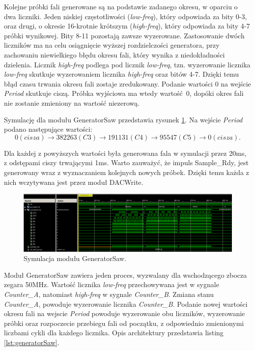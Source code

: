 \documentclass[a4paper,12pt]{article}
\begin{document}
Kolejne próbki fali generowane są na podstawie zadanego okresu, w oparciu o dwa liczniki. Jeden niskiej częstotliwości (\textit{low-freq}), który odpowiada za bity 0-3, oraz drugi, o okresie 16-krotnie krótszym (\textit{high-freq}), który odpowiada za bity 4-7 próbki wynikowej. Bity 8-11 pozostają zawsze wyzerowane. Zastosowanie dwóch liczników ma na celu osiągnięcie wyższej rozdzielczości generatora, przy zachowaniu niewielkiego błędu okresu fali, który wynika z niedokładności dzielenia. Licznik \textit{high-freq} podlega pod licznik \textit{low-freq}, tzn. wyzerowanie licznika \textit{low-freq} skutkuje wyzerowaniem licznika \textit{high-freq} oraz bitów 4-7. Dzięki temu błąd czasu trwania okresu fali zostaje zredukowany.
Podanie wartości 0 na wejście \textit{Period} skutkuje ciszą. Próbka wyjściowa ma wtedy wartość 0, dopóki okres fali nie zostanie zmieniony na wartość niezerową.

Symulację dla modułu GeneratorSaw przedstawia rysunek \ref{sim:gen_saw}. Na wejście \textit{Period} podano następujące wartości:
\begin{equation}
  0 (cisza) \rightarrow 382263 (C3) \rightarrow 191131 (C4) \rightarrow 95547 (C5) \rightarrow 0 (cisza).
\end{equation}

Dla każdej z powyższych wartości była generowana fala w symulacji przez 20ms, z odstępami ciszy trwającymi 1ms. Warto zauważyć, że impuls Sample\_Rdy, jest generowany wraz z wyznaczaniem kolejnych nowych próbek. Dzięki temu każda z nich wczytywana jest przez moduł DACWrite\cite{web:dacwrite}.

\begin{figure}[h]
  \centering
  \includegraphics[decodearray={1 0 1 0 1 0}, width=\linewidth]{images/generator_saw.png}
  \caption{Symulacja modułu GeneratorSaw.}
  \label{sim:gen_saw}
\end{figure}

Moduł GeneratorSaw zawiera jeden proces, wyzwalany dla wschodzącego zbocza zegara 50MHz. Wartość licznika \textit{low-freq} przechowywana jest w sygnale \textit{Counter\_A}, natomiast \textit{high-freq} w sygnale \textit{Counter\_B}. Zmiana stanu \textit{Counter\_A}, powoduje wyzerowanie licznika \textit{Counter\_B}. Podanie nowej wartości okresu fali na wejscie \textit{Period} powoduje wyzerowanie obu liczników, wyzerowanie próbki oraz rozpoczecie przebiegu fali od początku, z odpowiednio zmienionymi liczbami cykli dla każdego licznika.
Opis architektury przedstawia listing \ref{lst:generatorSaw}.
\end{document}

